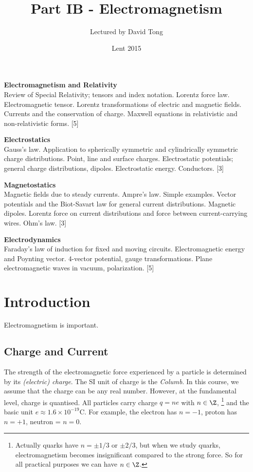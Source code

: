 \documentclass[a4paper]{article}
\title{Part IB - Electromagnetism}
\author{Lectured by David Tong}
\date{Lent 2015}
\begin{document}
\maketitle
{\small
\noindent\textbf{Electromagnetism and Relativity}\\
Review of Special Relativity; tensors and index notation. Lorentz force law. Electromagnetic tensor. Lorentz transformations of electric and magnetic fields. Currents and the conservation of charge. Maxwell equations in relativistic and non-relativistic forms.\hspace*{\fill} [5]

\vspace{10pt}
\noindent\textbf{Electrostatics}\\
Gauss's law. Application to spherically symmetric and cylindrically symmetric charge distributions.  Point, line and surface charges. Electrostatic potentials; general charge distributions, dipoles. Electrostatic energy. Conductors.\hspace*{\fill} [3]

\vspace{10pt}
\noindent\textbf{Magnetostatics}\\
Magnetic fields due to steady currents. Ampre's law. Simple examples. Vector potentials and the Biot-Savart law for general current distributions. Magnetic dipoles. Lorentz force on current distributions and force between current-carrying wires. Ohm's law.\hspace*{\fill} [3]

\vspace{10pt}
\noindent\textbf{Electrodynamics}\\
Faraday's law of induction for fixed and moving circuits. Electromagnetic energy and Poynting vector.  4-vector potential, gauge transformations. Plane electromagnetic waves in vacuum, polarization.\hspace*{\fill} [5]}

\tableofcontents
\section{Introduction}
Electromagnetism is important.
\subsection{Charge and Current}
The strength of the electromagnetic force experienced by a particle is determined by its \emph{(electric) charge}. The SI unit of charge is the \emph{Columb}. In this course, we assume that the charge can be any real number. However, at the fundamental level, charge is quantised. All particles carry charge $q = ne$ with $n\in \Z$, \footnote{Actually quarks have $n = \pm1/3$ or $\pm2/3$, but when we study quarks, electromagnetism becomes insignificant compared to the strong force. So for all practical purposes we can have $n\in \Z$.} and the basic unit $e \approx 1.6 \times 10^{-19} $C. For example, the electron has $n = -1$, proton has $n = +1$, neutron = $n = 0$.
\end{document}
